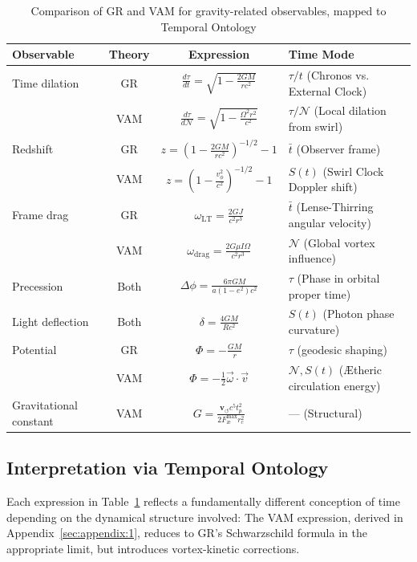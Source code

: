 \documentclass[preprint]{revtex4-2}
\begin{document}
\begin{table}[ht]
\centering
\caption{Comparison of GR and VAM for gravity-related observables, mapped to Temporal Ontology}
\label{tab:VAM-GR-temporal}
\begin{tabular}{|l|c|c|l|}
\hline
\textbf{Observable} & \textbf{Theory} & \textbf{Expression} & \textbf{Time Mode} \\
\hline
Time dilation &
GR & \( \frac{d\tau}{dt} = \sqrt{1 - \frac{2GM}{rc^2}} \) & \( \tau / t \) (Chronos vs. External Clock) \\
& VAM & \( \frac{d\tau}{d\mathcal{N}} = \sqrt{1 - \frac{\Omega^2 r^2}{c^2}} \) & \( \tau / \mathcal{N} \) (Local dilation from swirl) \\
\hline
Redshift &
GR & \( z = \left(1 - \frac{2GM}{rc^2} \right)^{-1/2} - 1 \) & \( \bar{t} \) (Observer frame) \\
& VAM & \( z = \left(1 - \frac{v_\phi^2}{c^2} \right)^{-1/2} - 1 \) & \( S(t) \) (Swirl Clock Doppler shift) \\
\hline
Frame drag &
GR & \( \omega_{\text{LT}} = \frac{2GJ}{c^2 r^3} \) & \( \bar{t} \) (Lense-Thirring angular velocity) \\
& VAM & \( \omega_{\text{drag}} = \frac{2G \mu I \Omega}{c^2 r^3} \) & \( \mathcal{N} \) (Global vortex influence) \\
\hline
Precession &
Both & \( \Delta\phi = \frac{6\pi GM}{a(1 - e^2)c^2} \) & \( \tau \) (Phase in orbital proper time) \\
\hline
Light deflection &
Both & \( \delta = \frac{4GM}{Rc^2} \) & \( S(t) \) (Photon phase curvature) \\
\hline
Potential &
GR & \( \Phi = -\frac{GM}{r} \) & \( \tau \) (geodesic shaping) \\
& VAM & \( \Phi = -\frac{1}{2} \vec{\omega} \cdot \vec{v} \) & \( \mathcal{N}, S(t) \) (Ætheric circulation energy) \\
\hline
Gravitational constant &
VAM & \( G = \frac{\mathbf{v}_{\scriptscriptstyle\boldsymbol{\circlearrowleft}} c^5 t_p^2}{2 F_{\text{\ae}}^{\text{max}} r_c^2} \) & — (Structural) \\
\hline
\end{tabular}
\end{table}

\subsection*{Interpretation via Temporal Ontology}

Each expression in Table~\ref{tab:VAM-GR-temporal} reflects a fundamentally different conception of time depending on the dynamical structure involved:
The VAM expression, derived in Appendix~\ref{sec:appendix:1}, reduces to GR’s Schwarzschild formula in the appropriate limit, but introduces vortex-kinetic corrections.\\
\end{document}
